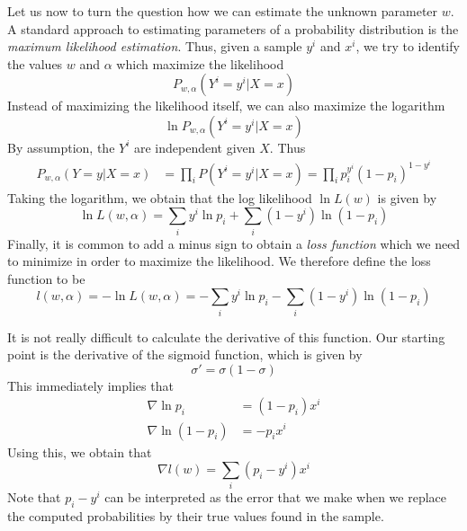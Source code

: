 \documentclass[a4paper, draft]{report}
\numberwithin{section}{chapter}
\numberwithin{equation}{chapter}
\theoremstyle{own}
\theoremstyle{remark}
\begin{document}
Let us now to turn the question how we can estimate the unknown parameter $w$.  A standard approach to estimating parameters of a probability distribution is the {\em maximum likelihood estimation}. Thus, given a sample $y^i$ and $x^i$, we try to identify the values $w$ and $\alpha$ which maximize the likelihood
$$
P_{w, \alpha}(Y^i = y^i | X = x ) 
$$
Instead of maximizing the likelihood itself, we can also maximize the logarithm
$$
\ln P_{w,\alpha}(Y^i = y^i | X = x ) 
$$
By assumption, the $Y^i$ are independent given $X$. Thus
\begin{align*}
P_{w,\alpha} (Y = y | X = x) &= \prod_i P(Y^i = y^i | X = x) = \prod_i p_i^{y^i}(1-p_i)^{1-y^i}
\end{align*}
 Taking the logarithm, we obtain that the log likelihood $\ln L(w)$ is given by
 $$
\ln L(w, \alpha) = \sum_i y^i \ln p_i + \sum_i (1-y^i) \ln (1-p_i)
 $$
 Finally, it is common to add a minus sign to obtain a {\em loss function} which we need to minimize in order to maximize the likelihood. We therefore define the loss function to be
 $$
 l(w, \alpha) = - \ln L(w,\alpha) = -\sum_i y^i \ln p_i - \sum_i (1-y^i) \ln (1-p_i)
 $$

It is not really difficult to calculate the derivative of this function. Our starting point is the derivative of the sigmoid function, which is given by
$$
\sigma' = \sigma (1 - \sigma)
$$
This immediately implies that
\begin{align*}
\nabla \ln p_i &= (1 - p_i) x^i \\
\nabla \ln (1-p_i) &= - p_i x^i
\end{align*}
Using this, we obtain that
$$
\nabla l(w) = \sum_i (p_i - y^i) x^i
$$
Note that $p_i - y^i$ can be interpreted as the error that we make when we replace the computed probabilities by their true values found in the sample. 
\end{document}
